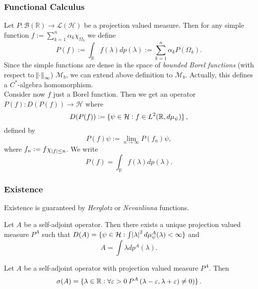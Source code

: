 \subsubsection*{Functional Calculus}
Let $P : \mathcal{B}(\mathbb{R}) \to \mathcal{L}(\mathcal{H})$ be a projection valued measure. Then for any simple function $f := \sum_{k = 1}^n \alpha_k \chi_{\Omega_k}$ we define 
\begin{equation*}
	P(f) := \int_\mathbb{R} f(\lambda) dp(\lambda) := \sum_{k = 1}^n \alpha_k P(\Omega_k).
\end{equation*}
Since the simple functions are dense in the space of \emph{bounded Borel functions} (with respect to $\norm{\cdot}_\infty$) $\mathcal{M}_b$, we can extend above definition to $\mathcal{M}_b$. Actually, this defines a $C^*$-algebra homomorphism.\\
Consider now $f$ just a Borel function. Then we get an operator $P(f) : D(P(f)) \to \mathcal{H}$ where
\begin{equation*}
	D(P(f)) := \cbr[0]{\psi \in \mathcal{H} : f \in L^2(\mathbb{R},d\mu_\psi)},
\end{equation*}
\noindent defined by
\begin{equation*}
	P(f)\psi := \lim_{n \to \infty} P(f_n)\psi,
\end{equation*}
\noindent where $f_n := f \chi_{\abs[0]{f} \leq n}$. We write
\begin{equation*}
	P(f) = \int_\mathbb{R} f(\lambda)dp(\lambda).
\end{equation*}

\subsubsection*{Existence}
Existence is guaranteed by \emph{Herglotz} or \emph{Nevanlinna} functions. 

\begin{theorem}
	Let $A$ be a self-adjoint operator. Then there exists a unique projection valued measure $P^A$ such that $D(A) = \cbr[0]{\psi \in \mathcal{H} : \int \abs{\lambda}^2 d\mu_\psi^A(\lambda) < \infty}$ and
	\begin{equation*}
		A = \int \lambda dp^A(\lambda).
	\end{equation*}
\end{theorem}

\begin{theorem}
	Let $A$ be a self-adjoint operator with projection valued measure $P^A$. Then
	\begin{equation*}
		\sigma(A) = \cbr[0]{\lambda \in \mathbb{R} : \forall \varepsilon > 0 \> P^A\intoo{\lambda - \varepsilon,\lambda + \varepsilon} \neq 0)}.
	\end{equation*}
\end{theorem}

